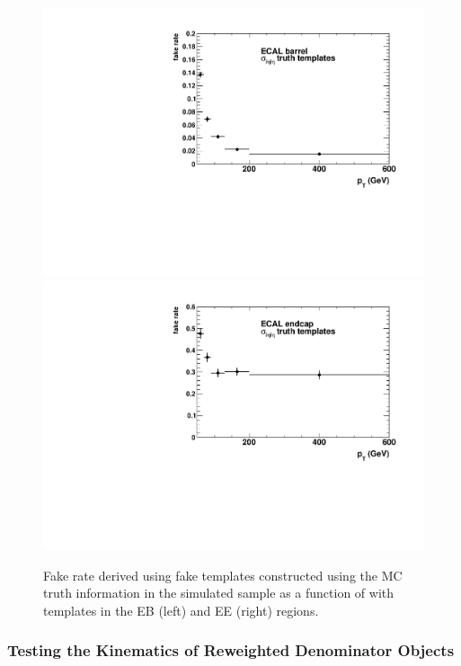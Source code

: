 \begin{figure}[!htbp]
  \centering
  \includegraphics[scale=0.40]{figures/closure_test_EBTruthFakeRate_sieie_chIso5To10.pdf}
  \includegraphics[scale=0.40]{figures/closure_test_EETruthFakeRate_sieie_chIso5To10.pdf}
  \caption{Fake rate derived using fake templates constructed using the MC truth information in the simulated sample as a function of \pt with \sieie templates in the EB (left) and EE (right) regions.}
  \label{fig:closure_test_fake_rates_sieie_truth}
\end{figure}


\subsubsection{Testing the Kinematics of Reweighted Denominator Objects}\label{sec:closure_test_kinematics}

